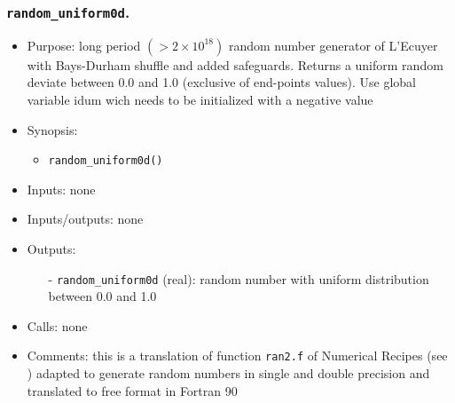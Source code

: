 \documentclass[12pt]{article}
\begin{document}
\subsubsection{{\tt random\_uniform0d}.}
\begin{itemize}
\item Purpose: long period $(> 2 \times 10^{18})$ random number generator of L'Ecuyer with Bays-Durham shuffle and added safeguards. Returns a uniform random deviate between 0.0 and 1.0 (exclusive of end-points values). Use global variable idum wich needs to be initialized with a negative value
\item Synopsis: 
\begin{itemize}
\item {\tt random\_uniform0d()}
\end{itemize}
\item Inputs: none
\item Inputs/outputs: none
\item Outputs: 
\begin{itemize}
\item[-] {\tt random\_uniform0d} (real): random number with uniform distribution between 0.0 and 1.0
\end{itemize}
\item Calls: none
\item Comments: this is a translation of function {\tt ran2.f} of Numerical Recipes (see \cite{numericalrecipes}) adapted to generate random numbers in single and double precision and translated to free format in Fortran 90
\end{itemize} 
\end{document}
